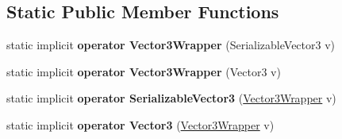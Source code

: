 \subsection*{Static Public Member Functions}
\begin{DoxyCompactItemize}
\item 
\hypertarget{struct_s_e_mod_a_p_i_1_1_a_p_i_1_1_type_converters_1_1_vector3_wrapper_a5f9d59c3759a8addb46410b3efa5bfdb}{}static implicit {\bfseries operator Vector3\+Wrapper} (Serializable\+Vector3 v)\label{struct_s_e_mod_a_p_i_1_1_a_p_i_1_1_type_converters_1_1_vector3_wrapper_a5f9d59c3759a8addb46410b3efa5bfdb}

\item 
\hypertarget{struct_s_e_mod_a_p_i_1_1_a_p_i_1_1_type_converters_1_1_vector3_wrapper_a03b33163ded97585890bf8f9dcf17f45}{}static implicit {\bfseries operator Vector3\+Wrapper} (Vector3 v)\label{struct_s_e_mod_a_p_i_1_1_a_p_i_1_1_type_converters_1_1_vector3_wrapper_a03b33163ded97585890bf8f9dcf17f45}

\item 
\hypertarget{struct_s_e_mod_a_p_i_1_1_a_p_i_1_1_type_converters_1_1_vector3_wrapper_ab2ff50f4fc9ad753dbbdbb6fc711cc91}{}static implicit {\bfseries operator Serializable\+Vector3} (\hyperlink{struct_s_e_mod_a_p_i_1_1_a_p_i_1_1_type_converters_1_1_vector3_wrapper}{Vector3\+Wrapper} v)\label{struct_s_e_mod_a_p_i_1_1_a_p_i_1_1_type_converters_1_1_vector3_wrapper_ab2ff50f4fc9ad753dbbdbb6fc711cc91}

\item 
\hypertarget{struct_s_e_mod_a_p_i_1_1_a_p_i_1_1_type_converters_1_1_vector3_wrapper_a88efa82786819052ac196f956af0e28b}{}static implicit {\bfseries operator Vector3} (\hyperlink{struct_s_e_mod_a_p_i_1_1_a_p_i_1_1_type_converters_1_1_vector3_wrapper}{Vector3\+Wrapper} v)\label{struct_s_e_mod_a_p_i_1_1_a_p_i_1_1_type_converters_1_1_vector3_wrapper_a88efa82786819052ac196f956af0e28b}

\end{DoxyCompactItemize}
